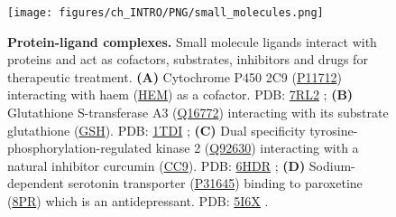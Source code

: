 \begin{figure}[htb!]
    \centering
    \texttt{[image: figures/ch\_INTRO/PNG/small\_molecules.png]}
    \caption[Protein-ligand complexes]{\textbf{Protein-ligand complexes.} Small molecule ligands interact with proteins and act as cofactors, substrates, inhibitors and drugs for therapeutic treatment. \textbf{(A)} Cytochrome P450 2C9 (\href{https://www.uniprot.org/uniprotkb/P11712/entry}{P11712}) interacting with haem (\href{https://www.ebi.ac.uk/pdbe-srv/pdbechem/chemicalCompound/show/HEM}{HEM}) as a cofactor. PDB: \href{https://www.ebi.ac.uk/pdbe/entry/pdb/7RL2}{7RL2} \cite{PARIKH_2021_CYTOP450}; \textbf{(B)} Glutathione S-transferase A3 (\href{https://www.uniprot.org/uniprotkb/Q16772/entry}{Q16772}) interacting with its substrate glutathione (\href{https://www.ebi.ac.uk/pdbe-srv/pdbechem/chemicalCompound/show/GSH}{GSH}). PDB: \href{https://www.ebi.ac.uk/pdbe/entry/pdb/1tdi}{1TDI} \cite{GU_2004_GST}; \textbf{(C)} Dual specificity tyrosine-phosphorylation-regulated kinase 2 (\href{https://www.uniprot.org/uniprotkb/Q92630/entry}{Q92630}) interacting with a natural inhibitor curcumin (\href{https://www.ebi.ac.uk/pdbe-srv/pdbechem/chemicalCompound/show/CC9}{CC9}). PDB: \href{https://www.ebi.ac.uk/pdbe/entry/pdb/6hdr}{6HDR} \cite{PDB_6HDR}; \textbf{(D)} Sodium-dependent serotonin transporter (\href{https://www.uniprot.org/uniprotkb/P31645/entry}{P31645}) binding to paroxetine (\href{https://www.ebi.ac.uk/pdbe-srv/pdbechem/chemicalCompound/show/8PR}{8PR}) which is an antidepressant. PDB: \href{https://www.ebi.ac.uk/pdbe/entry/pdb/5i6x}{5I6X} \cite{COLEMAN_2016_PAROXETIN}.}
    \label{fig:small_molecules}
\end{figure}

